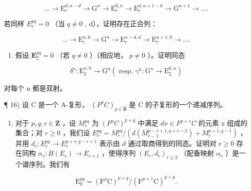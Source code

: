 \[
\dots \rightarrow \mathrm{E} _ {r} ^ {d, n - d} \rightarrow \mathrm{G} ^ {n} \rightarrow \mathrm{E} _ {r} ^ {0, n} \rightarrow \mathrm{E} _ {r} ^ {d, n + 1 - d} \rightarrow \mathrm{G} ^ {n + 1} \rightarrow \dots .
\]

若同样 \(E_{r}^{pq} = 0\) （当 \(q \neq 0\) , d），证明存在正合列：

\[
\dots \rightarrow \mathrm{E} _ {r} ^ {n, 0} \rightarrow \mathrm{G} ^ {n} \rightarrow \mathrm{E} _ {r} ^ {n - d, d} \rightarrow \mathrm{E} _ {r} ^ {n + 1, 0} \rightarrow \dots .
\]

\begin{enumerate}
\def\labelenumi{\alph{enumi})}
\setcounter{enumi}{5}
\tightlist
\item
  假设 \(\mathbf{E}_2^{pq} = 0\) （若 \(q \neq 0\) ）（相应地， \(p \neq 0\) ）。证明同态
\end{enumerate}

\[
\delta^ {n}: \mathrm{E} _ {2} ^ {n, 0} \rightarrow \mathrm{G} ^ {n} (\text { resp. } \gamma^ {n}: \mathrm{G} ^ {n} \rightarrow \mathrm{E} _ {2} ^ {0, n})
\]

对每个 n 都是双射。

¶ 16) 设 C 是一个 A-复形， \((F^{p}C)_{p\in\mathbf{Z}}\) 是 C 的子复形的一个递减序列。

\begin{enumerate}
\def\labelenumi{\alph{enumi})}
\tightlist
\item
  对于 \(p,q,r\in\mathbf{Z}\) ，设 \(M_{r}^{pq}\) 为 \((F^{p}C)^{p+q}\) 中满足 \(dx\in F^{p+r}C\) 的元素 x 组成的集合；对 \(r\geqslant0\) ，我们设 \(E_{r}^{pq}=M_{r}^{pq}/(d(M_{r-1}^{p-r+1,q+r-2})+M_{r}^{p+1,q-1})\) ，并用 \(d_{r}:E_{r}^{pq}\to E_{r}^{p+r,q-r+1}\) 表示由 \(d\) 通过取商得到的同态。证明对 \(r\geqslant0\) 存在同构 \(\alpha_{r}:H(E_{r})\to E_{r+1}\) ，使得序列 \((E_{r},d_{r})_{r\geqslant2}\) （配备映射 \(\alpha_{r}\) ）是一个谱序列。我们有
\end{enumerate}

\[
\mathrm{E} _ {0} ^ {p q} = (\mathrm{F} ^ {p} \mathrm{C}) ^ {p + q} / (\mathrm{F} ^ {p + 1} \mathrm{C}) ^ {p + q}.
\]

